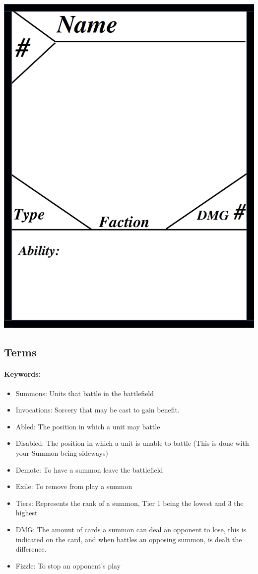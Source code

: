 \documentclass[12pt, letterpaper]{article}
\begin{document}
\begin{center}
    \includegraphics[scale = 0.4]{images/CardTemplate.png}
\end{center}

\newpage
\subsection{Terms}
\paragraph{Keywords: }
\begin{itemize}
    \item Summons: Units that battle in the battlefield
    \item Invocations: Sorcery that may be cast to gain benefit. 
    \item Abled: The position in which a unit may battle 
    \item Disabled: The position in which a unit is unable to battle (This is done with your Summon being sideways)
    \item Demote: To have a summon leave the battlefield
    \item Exile: To remove from play a summon
    \item Tiers: Represents the rank of a summon, Tier 1 being the lowest and 3 the highest
    \item DMG: The amount of cards a summon can deal an opponent to lose, this is indicated on the card, and when battles an opposing summon, is dealt the difference.
    \item Fizzle: To stop an opponent's play 
\end{itemize}
\end{document}
